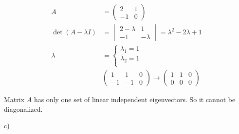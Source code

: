 \documentclass[letterpaper, 11pt]{article}
\newcommand{\1}{\mathds{1}}	%
\theoremstyle{definition}
\begin{document}
\begin{align*}
    A                  & = \begin{pmatrix}
                               2  & 1 \\
                               -1 & 0
                           \end{pmatrix}                                      \\
    \det (A-\lambda I) & = \begin{vmatrix}
                               2-\lambda & 1        \\
                               -1        & -\lambda
                           \end{vmatrix}= \lambda ^{2}-2\lambda+1              \\
    \lambda            & = \left\{\begin{array}{l}
                                      \lambda_{1} = 1 \\
                                      \lambda_{2} = 1 \\
                                  \end{array}\right.                           \\
                       & \left(\begin{array}{cc|c}
                                       1  & 1  & 0 \\
                                       -1 & -1 & 0
                                   \end{array}\right) \to \left(\begin{array}{cc|c}
                                                                    1 & 1 & 0 \\
                                                                    0 & 0 & 0
                                                                \end{array}\right)
\end{align*}

Matrix $A$ has only one set of linear independent eigenvectors. So it cannot be diagonalized.

c)
\end{document}
